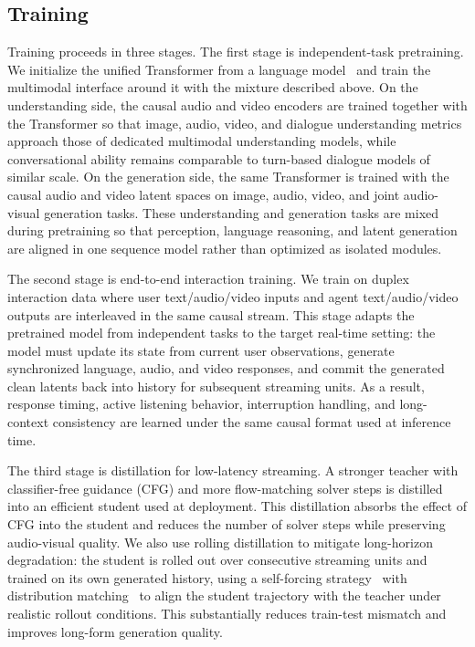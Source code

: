 \documentclass{llmxive}
\begin{document}
\subsection{Training}
Training proceeds in three stages. The first stage is independent-task pretraining. We initialize the unified Transformer from a language model~\citep{yang2025qwen25,yang2025qwen3} and train the multimodal interface around it with the mixture described above. On the understanding side, the causal audio and video encoders are trained together with the Transformer so that image, audio, video, and dialogue understanding metrics approach those of dedicated multimodal understanding models, while conversational ability remains comparable to turn-based dialogue models of similar scale. On the generation side, the same Transformer is trained with the causal audio and video latent spaces on image, audio, video, and joint audio-visual generation tasks. These understanding and generation tasks are mixed during pretraining so that perception, language reasoning, and latent generation are aligned in one sequence model rather than optimized as isolated modules.

The second stage is end-to-end interaction training. We train on duplex interaction data where user text/audio/video inputs and agent text/audio/video outputs are interleaved in the same causal stream. This stage adapts the pretrained model from independent tasks to the target real-time setting: the model must update its state from current user observations, generate synchronized language, audio, and video responses, and commit the generated clean latents back into history for subsequent streaming units. As a result, response timing, active listening behavior, interruption handling, and long-context consistency are learned under the same causal format used at inference time.

The third stage is distillation for low-latency streaming. A stronger teacher with classifier-free guidance (CFG) and more flow-matching solver steps is distilled into an efficient student used at deployment. This distillation absorbs the effect of CFG into the student and reduces the number of solver steps while preserving audio-visual quality. We also use rolling distillation to mitigate long-horizon degradation: the student is rolled out over consecutive streaming units and trained on its own generated history, using a self-forcing strategy~\citep{huang2025selfforcing} with distribution matching~\citep{yin2024onestepdiffusiondistributionmatching,yin2024improveddistributionmatchingdistillation} to align the student trajectory with the teacher under realistic rollout conditions. This substantially reduces train-test mismatch and improves long-form generation quality.
\end{document}
